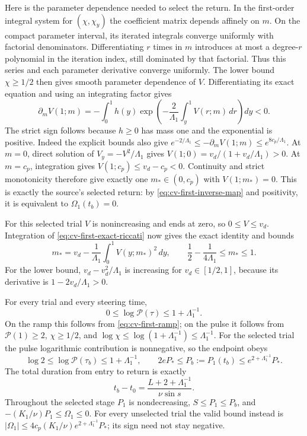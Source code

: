 Here is the parameter dependence needed to select the return.
In the first-order integral system for $(\chi,\chi_y)$ the coefficient
matrix depends affinely on $m$. On the compact parameter interval,
its iterated integrals converge uniformly with factorial denominators.
Differentiating $r$ times in $m$ introduces at most a degree-$r$
polynomial in the iteration index, still dominated by that factorial.
Thus this series and each parameter derivative converge uniformly.
The lower bound $\chi\geq1/2$ then gives smooth parameter dependence
of $V$. Differentiating its exact equation and using an integrating
factor gives
\begin{equation}
 \partial_m V(1;m)=
 -\int_0^1h(y)\exp\!\left(-\frac2{\Lambda_1}
                 \int_y^1V(r;m)\,dr\right)dy<0.
 \label{eq:cv-first-root-derivative}
\end{equation}
The strict sign follows because $h\geq0$ has mass one and the
exponential is positive. Indeed the explicit bounds also give
$e^{-2/\Lambda_1}\leq-\partial_mV(1;m)
\leq e^{8c_p/\Lambda_1}$.
At $m=0$, direct solution of $V_y=-V^2/\Lambda_1$ gives
$V(1;0)=v_d/(1+v_d/\Lambda_1)>0$. At $m=c_p$, integration gives
$V(1;c_p)\leq v_d-c_p<0$. Continuity and strict monotonicity
therefore give exactly one $m_*\in(0,c_p)$ with $V(1;m_*)=0$.
This is exactly the source's selected return: by
\eqref{eq:cv-first-inverse-map} and positivity, it is equivalent
to $\Omega_1(t_b)=0$.

For this selected trial $V$ is nonincreasing and ends at zero, so
$0\leq V\leq v_d$. Integration of
\eqref{eq:cv-first-exact-riccati} now gives the exact identity and bounds
\begin{equation}
 m_*=v_d-\frac1{\Lambda_1}\int_0^1V(y;m_*)^2\,dy,
 \qquad \frac12-\frac1{4\Lambda_1}\leq m_*\leq1.
 \label{eq:cv-first-root-bounds}
\end{equation}
For the lower bound, $v_d-v_d^2/\Lambda_1$ is increasing for
$v_d\in[1/2,1]$, because its derivative is
$1-2v_d/\Lambda_1>0$.

For every trial and every steering time,
\[
 0\leq\log\mathcal P(\tau)\leq1+\Lambda_1^{-1}.
\]
On the ramp this follows from \eqref{eq:cv-first-ramp}; on the pulse
it follows from $\mathcal P(1)\geq2$, $\chi\geq1/2$, and
$\log\chi\leq\log(1+\Lambda_1^{-1})\leq\Lambda_1^{-1}$.
For the selected trial the pulse logarithmic contribution is
nonnegative, so the endpoint obeys
\begin{equation}
 \log2\leq\log\mathcal P(\tau_b)\leq1+\Lambda_1^{-1},\qquad
 2eP_*\leq P_b:=P_1(t_b)\leq e^{2+\Lambda_1^{-1}}P_*.
 \label{eq:cv-first-gain}
\end{equation}
The total duration from entry to return is exactly
\begin{equation}
 t_b-t_0=\frac{L+2+\Lambda_1^{-1}}{\nu\sin s}.
 \label{eq:cv-first-duration}
\end{equation}
Throughout the selected stage $P_1$ is nondecreasing,
$S\leq P_1\leq P_b$, and
$-(K_1/\nu)P_1\leq\Omega_1\leq0$.
For every unselected trial the valid bound instead is
$|\Omega_1|\leq4c_p(K_1/\nu)
 e^{2+\Lambda_1^{-1}}P_*$; its sign need not stay negative.

